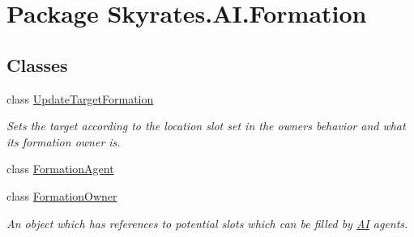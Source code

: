 \hypertarget{namespace_skyrates_1_1_a_i_1_1_formation}{\section{Package Skyrates.\-A\-I.\-Formation}
\label{namespace_skyrates_1_1_a_i_1_1_formation}
}
\subsection*{Classes}
\begin{DoxyCompactItemize}
\item 
class \hyperlink{class_skyrates_1_1_a_i_1_1_formation_1_1_update_target_formation}{Update\-Target\-Formation}
\begin{DoxyCompactList}\small\item\em Sets the target according to the location slot set in the owners behavior and what its formation owner is. \end{DoxyCompactList}\item 
class \hyperlink{class_skyrates_1_1_a_i_1_1_formation_1_1_formation_agent}{Formation\-Agent}
\item 
class \hyperlink{class_skyrates_1_1_a_i_1_1_formation_1_1_formation_owner}{Formation\-Owner}
\begin{DoxyCompactList}\small\item\em An object which has references to potential slots which can be filled by \hyperlink{namespace_skyrates_1_1_a_i}{A\-I} agents. \end{DoxyCompactList}\end{DoxyCompactItemize}
